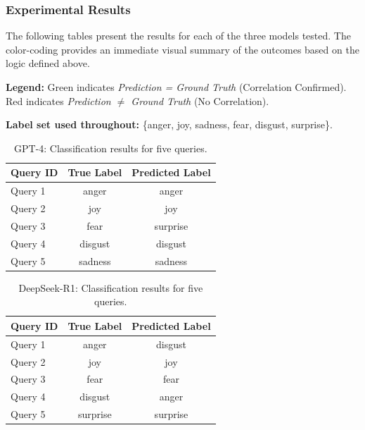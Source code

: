 \subsubsection{Experimental Results}
The following tables present the results for each of the three models tested. The color-coding provides an immediate visual summary of the outcomes based on the logic defined above.

\vspace{1em}
\noindent\textbf{Legend:} \textcolor{corrGreen}{Green} indicates \emph{Prediction = Ground Truth} (Correlation Confirmed). \textcolor{corrRed}{Red} indicates \emph{Prediction $\neq$ Ground Truth} (No Correlation).

\vspace{0.5em}
\noindent\textbf{Label set used throughout:} \{anger, joy, sadness, fear, disgust, surprise\}.

\begin{table}[H]
\centering
\caption{GPT-4: Classification results for five queries.}
\begin{tabular}{lcc}
\toprule
\textbf{Query ID} & \textbf{True Label} & \textbf{Predicted Label} \\
\midrule
Query 1 & anger   & \textcolor{corrGreen}{anger} \\
Query 2 & joy     & \textcolor{corrGreen}{joy} \\
Query 3 & fear    & \textcolor{corrRed}{surprise} \\
Query 4 & disgust & \textcolor{corrGreen}{disgust} \\
Query 5 & sadness & \textcolor{corrGreen}{sadness} \\
\bottomrule
\end{tabular}
\label{tab:gpt4_iter0}
\end{table}

\begin{table}[H]
\centering
\caption{DeepSeek-R1: Classification results for five queries.}
\begin{tabular}{lcc}
\toprule
\textbf{Query ID} & \textbf{True Label} & \textbf{Predicted Label} \\
\midrule
Query 1 & anger    & \textcolor{corrRed}{disgust} \\
Query 2 & joy      & \textcolor{corrGreen}{joy} \\
Query 3 & fear     & \textcolor{corrGreen}{fear} \\
Query 4 & disgust  & \textcolor{corrRed}{anger} \\
Query 5 & surprise & \textcolor{corrGreen}{surprise} \\
\bottomrule
\end{tabular}
\label{tab:deepseek_iter0}
\end{table}

